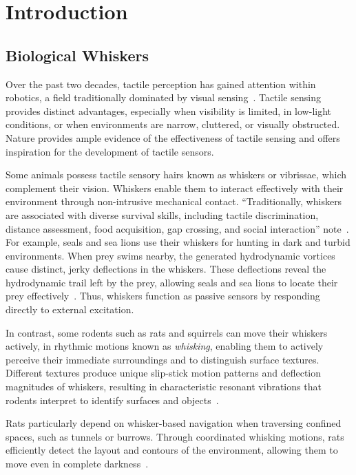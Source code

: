 

\chapter{Introduction}


\section{Biological Whiskers}

Over the past two decades, tactile perception has gained attention within robotics, a field traditionally dominated by visual sensing~\cite{s22072705}.
Tactile sensing provides distinct advantages, especially when visibility is limited, in low-light conditions, or when environments are narrow, cluttered, or visually obstructed.
Nature provides ample evidence of the effectiveness of tactile sensing and offers inspiration for the development of tactile sensors.

Some animals possess tactile sensory hairs known as whiskers or vibrissae, which complement their vision.
Whiskers enable them to interact effectively with their environment through non-intrusive mechanical contact.
\enquote{Traditionally, whiskers are associated with diverse survival skills, including tactile discrimination, distance assessment, food acquisition, gap crossing, and social interaction} note~\textcite{IBARRACASTANEDA2022100034}.
For example, seals and sea lions use their whiskers for hunting in dark and turbid environments.
When prey swims nearby, the generated hydrodynamic vortices cause distinct, jerky deflections in the whiskers.
These deflections reveal the hydrodynamic trail left by the prey, allowing seals and sea lions to locate their prey effectively~\cite{muthuramalingam2018sealsealionwhiskers}.
Thus, whiskers function as passive sensors by responding directly to external excitation.

In contrast, some rodents such as rats and squirrels can move their whiskers actively, in rhythmic motions known as \textit{whisking}, enabling them to actively perceive their immediate surroundings and to distinguish surface textures.
Different textures produce unique slip-stick motion patterns and deflection magnitudes of whiskers, resulting in characteristic resonant vibrations that rodents interpret to identify surfaces and objects~\cite{wolfe2008texture}.

Rats particularly depend on whisker-based navigation when traversing confined spaces, such as tunnels or burrows.
Through coordinated whisking motions, rats efficiently detect the layout and contours of the environment, allowing them to move even in complete darkness~\cite{wolfe2008texture}.

